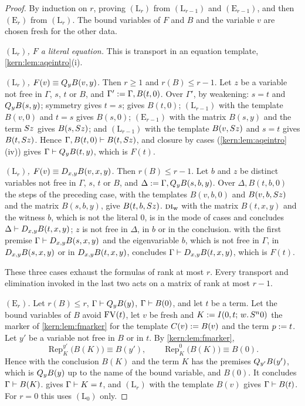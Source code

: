 \begin{proof}
By induction on $r$, proving $(\mathrm L_r)$ from $(\mathrm L_{r-1})$ and
$(\mathrm E_{r-1})$, and then $(\mathrm E_r)$ from $(\mathrm L_r)$.  The
bound variables of $F$ and $B$ and the variable $v$ are chosen fresh for the
other data.

\emph{$(\mathrm L_r)$, $F$ a literal equation.}  This is transport in an
equation template, \cref{kern:lem:aqeintro}(i).

\emph{$(\mathrm L_r)$, $F(v)\equiv Q_{y}B(v,y)$.}  Then $r\ge 1$ and
$r(B)\le r-1$.  Let $z$ be a variable not free in $\Gamma$, $s$, $t$ or $B$,
and $\Gamma'\mathrel{:=}\Gamma,B(t,0)$.  Over $\Gamma'$, by weakening: $s=t$ and
$Q_{y}B(s,y)$; symmetry gives $t=s$;  gives $B(t,0)$;
$(\mathrm L_{r-1})$ with the template $B(v,0)$ and $t=s$ gives $B(s,0)$;
$(\mathrm E_{r-1})$ with the matrix $B(s,y)$ and the term $S z$ gives
$B(s,S z)$; and $(\mathrm L_{r-1})$ with the template $B(v,S z)$ and
$s=t$ gives $B(t,S z)$.  Hence $\Gamma,B(t,0)\vdash B(t,S z)$, and
closure by cases (\cref{kern:lem:aqeintro}(iv)) gives
$\Gamma\vdash Q_{y}B(t,y)$, which is $F(t)$.

\emph{$(\mathrm L_r)$, $F(v)\equiv D_{x,y}B(v,x,y)$.}  Then $r(B)\le r-1$.
Let $b$ and $z$ be distinct variables not free in $\Gamma$, $s$, $t$ or $B$,
and $\Delta\mathrel{:=}\Gamma,Q_{y}B(s,b,y)$.  Over $\Delta,B(t,b,0)$ the steps of
the preceding case, with the templates $B(v,b,0)$ and $B(v,b,S z)$ and the
matrix $B(s,b,y)$, give $B(t,b,S z)$.  $\rulename{DI}_{\mathrm{w}}$ with
the matrix $B(t,x,y)$ and the witness $b$, which is not the literal $0$, is
in the mode of cases and concludes $\Delta\vdash D_{x,y}B(t,x,y)$; $z$ is not
free in $\Delta$, in $b$ or in the conclusion.   with the first
premise $\Gamma\vdash D_{x,y}B(s,x,y)$ and the eigenvariable $b$, which is
not free in $\Gamma$, in $D_{x,y}B(s,x,y)$ or in $D_{x,y}B(t,x,y)$,
concludes $\Gamma\vdash D_{x,y}B(t,x,y)$, which is $F(t)$.

These three cases exhaust the formulas of rank at most $r$.  Every
transport and elimination invoked in the last two acts on a matrix of rank
at most $r-1$.

\emph{$(\mathrm E_r)$.}  Let $r(B)\le r$, $\Gamma\vdash Q_{y}B(y)$,
$\Gamma\vdash B(0)$, and let $t$ be a term.  Let the bound variables of $B$
avoid $\operatorname{FV}(t)$, let $v$ be fresh and $K\mathrel{:=}I(0,t;\,w.\,S^{n}0)$ the
marker of \cref{kern:lem:fmarker} for the template $C(v)\mathrel{:=} B(v)$ and the
term $p\mathrel{:=} t$.  Let $y'$ be a variable not free in $B$ or in $t$.  By
\cref{kern:lem:fmarker},
\[
 \operatorname{Rep}_{K}^{y'}\bigl(B(K)\bigr)\equiv B(y'),\qquad
 \operatorname{Rep}_{K}^{0}\bigl(B(K)\bigr)\equiv B(0).
\]
Hence  with the conclusion $B(K)$ and the term $K$ has the
premises $Q_{y'}B(y')$, which is $Q_{y}B(y)$ up to the name of the bound
variable, and $B(0)$.  It concludes $\Gamma\vdash B(K)$.  
gives $\Gamma\vdash K=t$, and $(\mathrm L_r)$ with the template $B(v)$
gives $\Gamma\vdash B(t)$.  For $r=0$ this uses $(\mathrm L_0)$ only.
\end{proof}

